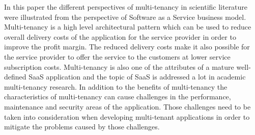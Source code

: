 \documentclass[conference]{sasmoota2017}
\begin{document}
In this paper the different perspectives of multi-tenancy in scientific literature were illustrated from the perspective of Software as a Service business model. Multi-tenancy is a high level architectural pattern which can be used to reduce overall delivery costs of the application for the service provider in order to improve the profit margin. The reduced delivery costs make it also possible for the service provider to offer the service to the customers at lower service subscription costs. Multi-tenancy is also one of the attributes of a mature well-defined SaaS application and the topic of SaaS is addressed a lot in academic multi-tenancy research. In addition to the benefits of multi-tenancy the characteristics of multi-tenancy can cause challenges in the performance, maintenance and security areas of the application. Those challenges need to be taken into consideration when developing multi-tenant applications in order to mitigate the problems caused by those challenges. 







%
%
%



%
%



\end{document}
